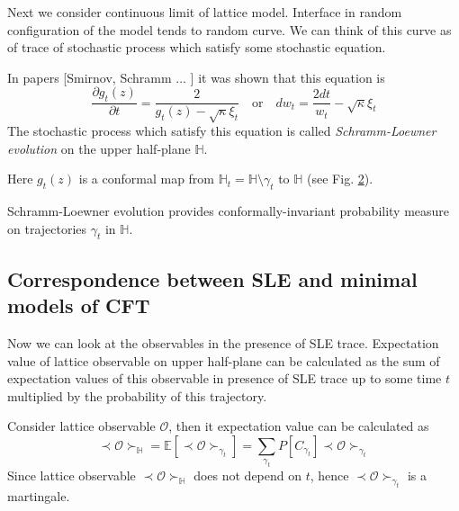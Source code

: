 \documentclass[12pt]{article}
\theoremstyle{definition}
\theoremstyle{definition} \newtheorem{Def}{Definition}
\begin{document}
\begin{figure}[h]
  \label{fig:sle}
\end{figure}

Next we consider continuous limit of lattice model. Interface in random configuration of the model tends to random curve. We can think of this curve as of trace of stochastic process which satisfy some stochastic equation. 

In papers [Smirnov, Schramm ... ] it was shown that this equation is
\begin{equation*}
  \frac{\partial g_t(z)}{\partial t} = \frac{ 2}{g_t(z)-\sqrt{\kappa}\xi_{t}} \quad \text{or} \quad       d w _{t}= \frac{2dt}{w_{t} }-\sqrt{\kappa}\xi_{t}
\end{equation*}
The stochastic process which satisfy this equation is called     {\it Schramm-Loewner evolution} on the upper half-plane $\mathbb{H}$.

Here $g_{t}(z)$ is a conformal map from $\mathbb{H}_{t}=\mathbb{H}\setminus \gamma_{t}$ to $\mathbb{H}$ (see Fig. \ref{fig:sle2}).
\begin{figure}[h]
  \label{fig:sle2}
\end{figure}

Schramm-Loewner evolution provides conformally-invariant probability measure on trajectories $\gamma_{t}$ in $\mathbb{H}$.

\subsection{Correspondence between SLE and minimal models of CFT}

Now we can look at the observables in the presence of SLE trace. Expectation value of lattice observable on upper half-plane can be calculated as the sum of expectation values of this observable in presence of SLE trace up to some time $t$ multiplied by the probability of this trajectory. 

Consider lattice observable $\mathcal{O}$, then it expectation value can be calculated as
\begin{equation*}
  \prec \mathcal{O} \succ_{\mathbb{H}}=\mathbb{E}\left[\prec\mathcal{O}\succ_{\gamma_{t}}\right]=\sum_{\gamma_{t}} P\left[C_{\gamma_{t}}\right] \prec \mathcal{O} \succ_{\gamma_{t}}
\end{equation*}
Since lattice observable  $\prec \mathcal{O} \succ_{\mathbb{H}}$ does not depend on $t$, hence $\prec\mathcal{O}\succ_{\gamma_{t}}$ is a martingale.
\end{document}
